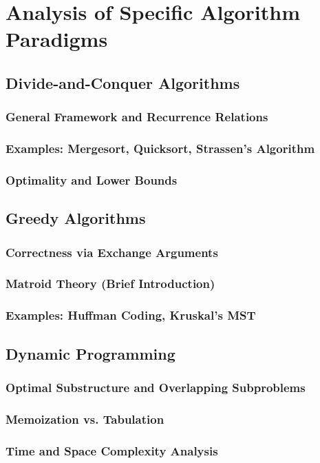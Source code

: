 \chapter{Analysis of Specific Algorithm Paradigms}
\section{Divide-and-Conquer Algorithms}
\subsection{General Framework and Recurrence Relations}
\subsection{Examples: Mergesort, Quicksort, Strassen's Algorithm}
\subsection{Optimality and Lower Bounds}

\section{Greedy Algorithms}
\subsection{Correctness via Exchange Arguments}
\subsection{Matroid Theory (Brief Introduction)}
\subsection{Examples: Huffman Coding, Kruskal's MST}

\section{Dynamic Programming}
\subsection{Optimal Substructure and Overlapping Subproblems}
\subsection{Memoization vs. Tabulation}
\subsection{Time and Space Complexity Analysis}
